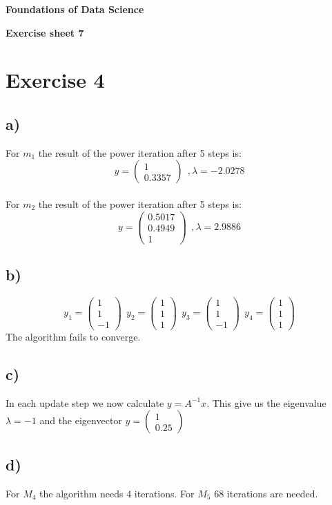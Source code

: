 \documentclass[a4paper,10pt]{article}
\begin{document}
\centerline{\Large\bfseries  Foundations of Data Science }
\centerline{\bfseries  Exercise sheet 7}


\section*{Exercise 4}
\subsection*{a)}
For $m_1$ the result of the power iteration after 5 steps is:
\[y=\begin{pmatrix} 1 \\ 0.3357  \end{pmatrix} \ \ , \lambda=-2.0278 \] \\
For $m_2$ the result of the power iteration after 5 steps is:
\[y=\begin{pmatrix} 0.5017 \\ 0.4949 \\1  \end{pmatrix} \ \ , \lambda=2.9886 \]
\subsection*{b)}
\[y_1=\begin{pmatrix} 1 \\ 1 \\-1  \end{pmatrix} \ \ y_2=\begin{pmatrix} 1 \\ 1 \\1  \end{pmatrix} \ \ y_3=\begin{pmatrix} 1 \\ 1 \\-1  \end{pmatrix}\  \ y_4=\begin{pmatrix} 1 \\ 1 \\1  \end{pmatrix} \]
The algorithm fails to converge. 
\subsection*{c)}
In each update step we now calculate $y=A^{-1} x$. This give us the eigenvalue $\lambda=-1$ and the eigenvector $y= \begin{pmatrix} 1 \\ 0.25   \end{pmatrix}$
\subsection*{d)}
For $M_4$ the algorithm needs 4 iterations. For $M_5$ 68 iterations are needed. 
\end{document}
